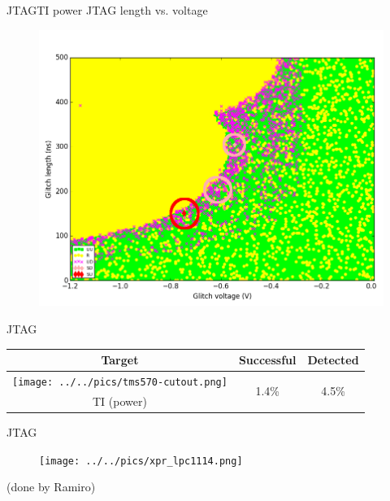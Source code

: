 \documentclass[table]{beamer}
\begin{document}
\begin{frame}{JTAG}{TI power JTAG length vs. voltage}
    \vspace{-.3cm}
    \begin{figure}[H]
      \centering
      \includegraphics[width=.8\textwidth]{../../plots/newplots/ti-jtag-voltage-length.png}
    \end{figure}
\end{frame}

\begin{frame}{JTAG}
    \begin{table}[H]
          \centering
          \begin{tabular}{c c c}
          \toprule
            \cellcolor{white!100} Target & Successful & Detected \\
            \midrule
            \texttt{[image: ../../pics/tms570-cutout.png]} & \multirow{ 2}{*}{1.4\%} & \multirow{ 2}{*}{4.5\%} \\ TI (power) & &\\
          \bottomrule
          \end{tabular}
    \end{table}
\end{frame}

\begin{frame}{JTAG}
    \begin{figure}[H]
      \centering
      \texttt{[image: ../../pics/xpr\_lpc1114.png]}
    \end{figure}

    (done by Ramiro)
\end{frame}
\end{document}
